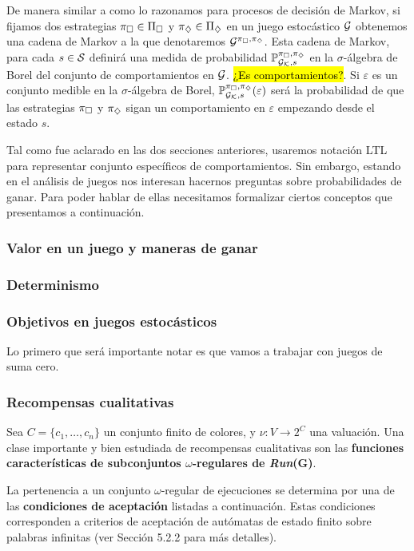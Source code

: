 De manera similar a como lo razonamos para procesos de decisión de Markov, si
fijamos dos estrategias $\pi_\square \in \Pi_\square$ y $\pi_\diamondsuit \in \Pi_\diamondsuit$
en un juego estocástico $\mathcal{G}$ obtenemos una cadena de Markov a la que
denotaremos $\mathcal{G}^{\pi_\square, \pi_\diamondsuit}$. Esta cadena de Markov, para cada $s \in
	\mathcal{S}$ definirá una medida de probabilidad $\mathbb{P}_{\mathcal{G}_{\mathcal{K}}, s}^{\pi_\square, \pi_\diamondsuit}$ en la $\sigma$-álgebra de
Borel del conjunto de comportamientos en $\mathcal{G}$. \hl{¿Es comportamientos?}. Si
$\varepsilon$ es un conjunto medible en la $\sigma$-álgebra de Borel,
$\mathbb{P}_{\mathcal{G}_{\mathcal{K}}, s}^{\pi_\square, \pi_\diamondsuit}(\varepsilon)$ será la probabilidad de que las estrategias $\pi_\square$ y
$\pi_\diamondsuit$ sigan un comportamiento en $\varepsilon$ empezando desde el estado
$s$.

Tal como fue aclarado en las dos secciones anteriores, usaremos notación LTL
para representar conjunto específicos de comportamientos. Sin embargo, estando
en el análisis de juegos nos interesan hacernos preguntas sobre probabilidades
de ganar. Para poder hablar de ellas necesitamos formalizar ciertos conceptos
que presentamos a continuación.

\subsubsection{Valor en un juego y maneras de ganar}

\subsubsection{Determinismo}

\subsubsection{Objetivos en juegos estocásticos}

Lo primero que será importante notar es que vamos a trabajar con juegos de suma
cero.

\subsubsection{Recompensas cualitativas}

Sea \(C = \{c_1, \ldots, c_n\}\) un conjunto finito de colores, y \(\nu : V
\rightarrow 2^C\) una valuación. Una clase importante y bien estudiada de
recompensas cualitativas son las \textbf{funciones características de
	subconjuntos \(\omega\)-regulares de \textit{Run}(G)}.

La pertenencia a un conjunto \(\omega\)-regular de ejecuciones se determina por
una de las \textbf{condiciones de aceptación} listadas a continuación. Estas
condiciones corresponden a criterios de aceptación de autómatas de estado
finito sobre palabras infinitas (ver Sección 5.2.2 para más detalles).

